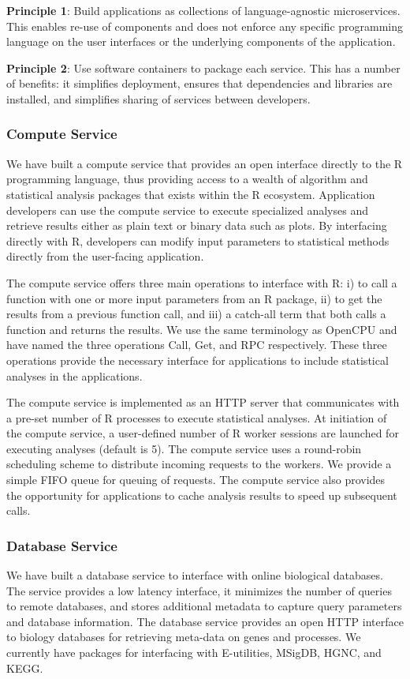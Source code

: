 \textbf{Principle 1}: Build applications as collections of language-agnostic
microservices. This enables re-use of components and does not enforce any
specific programming language on the user interfaces or the underlying
components of the application. 

\textbf{Principle 2}: Use software containers to package each service. This has
a number of benefits: it simplifies deployment, ensures that dependencies and
libraries are installed, and  simplifies sharing of services between
developers. 

\subsubsection{Compute Service}
We have built a compute service that provides an open interface directly to the
R programming language, thus providing access to a wealth of algorithm and
statistical analysis packages that exists within the R ecosystem.  
Application developers can use the compute service to execute specialized
analyses and retrieve results either as plain text or binary data such as plots.
By interfacing directly with R, developers can modify input parameters to
statistical methods directly from the user-facing application. 

The compute service offers three main operations to interface with R: i) to call
a function with one or more input parameters from an R package, ii) to get the
results from a previous function call, and iii) a catch-all term that both calls
a function and returns the results.  We use the same terminology as
OpenCPU\cite{opencpu} and have named the three operations Call, Get, and RPC
respectively. These three operations provide the necessary interface for
applications to include statistical analyses in the applications.

The compute service is implemented as an HTTP server that communicates with a
pre-set number of R processes to execute statistical analyses. 
At initiation of the compute service, a user-defined number of R worker sessions
are launched for executing analyses (default is 5).  
The compute service uses a round-robin scheduling scheme to distribute incoming
requests to the workers. We provide a simple FIFO queue for queuing of requests.
The compute service also provides the opportunity for applications to cache
analysis results to speed up subsequent calls. 

\subsubsection{Database Service} 
We have built a database service to interface with online biological databases.
The service provides a low latency interface, it minimizes the number of queries
to remote databases, and stores additional metadata to capture query parameters
and database information.  The database service provides an open HTTP interface
to biology databases for retrieving meta-data on genes and processes.  We
currently have packages for interfacing with E-utilities\cite{sayers2009entrez},
MSigDB, HGNC\cite{gray2014genenames}, and KEGG.


